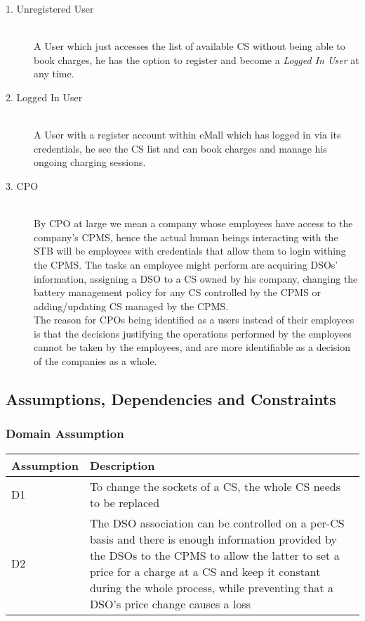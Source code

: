 \documentclass[11pt]{article}
\begin{document}
\begin{description}
    \item [1. Unregistered User] \hfill \\
        A User which just accesses the list of available CS without being able to book charges, he has the option to register and become a \textit{Logged In User} at any time.
    \item [2. Logged In User] \hfill \\
        A User with a register account within eMall which has logged in via its credentials, he see the CS list and can book charges and manage his ongoing charging sessions.
    \item [3. CPO] \hfill \\
        By CPO at large we mean a company whose employees have access to the company's CPMS, hence the actual human beings interacting with the STB will be employees with credentials that allow them to login withing the CPMS. The tasks an employee might perform are acquiring DSOs' information, assigning a DSO to a CS owned by his company, changing the battery management policy for any CS controlled by the CPMS or adding/updating CS managed by the CPMS. \\
        The reason for CPOs being identified as a users instead of their employees is that the decisions justifying the operations performed by the employees cannot be taken by the employees, and are more identifiable as a decision of the companies as a whole.
\end{description}

\subsection{Assumptions, Dependencies and Constraints}

\subsubsection{Domain Assumption}

\begin{table}[H]
    \centering
    \setlength{\tabcolsep}{18pt}
    \renewcommand{\arraystretch}{1.2}
    \begin{tabularx}{\textwidth}{|>{\centering\hsize=0.3\hsize}X|>{\hsize=1.7\hsize}X|}
        \hline
        \textbf{Assumption} & \textbf{Description} \\
        \hline
        D1 & To change the sockets of a CS, the whole CS needs to be replaced \\
        \hline
        D2 & The DSO association can be controlled on a per-CS basis and there is enough information provided by the DSOs to the CPMS to allow the latter to set a price for a charge at a CS and keep it constant during the whole process, while preventing that a DSO's price change causes a loss \\
        \hline
    \end{tabularx}
    \label{tab:domain_assumptions}
\end{table}
\end{document}
